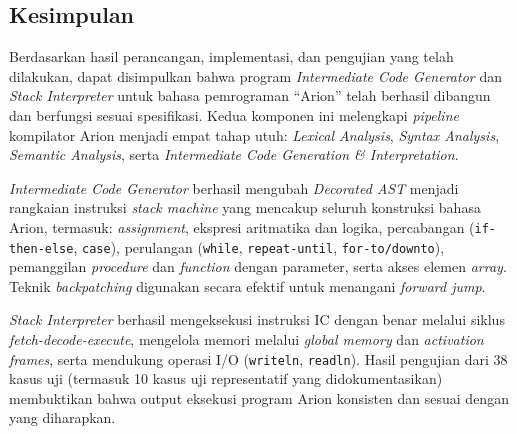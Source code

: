 \documentclass[12pt, a4paper]{article}
\begin{document}
\subsection{Kesimpulan}
Berdasarkan hasil perancangan, implementasi, dan pengujian yang telah dilakukan, dapat disimpulkan bahwa program \textit{Intermediate Code Generator} dan \textit{Stack Interpreter} untuk bahasa pemrograman ``Arion'' telah berhasil dibangun dan berfungsi sesuai spesifikasi. Kedua komponen ini melengkapi \textit{pipeline} kompilator Arion menjadi empat tahap utuh: \textit{Lexical Analysis}, \textit{Syntax Analysis}, \textit{Semantic Analysis}, serta \textit{Intermediate Code Generation \& Interpretation}.

\textit{Intermediate Code Generator} berhasil mengubah \textit{Decorated AST} menjadi rangkaian instruksi \textit{stack machine} yang mencakup seluruh konstruksi bahasa Arion, termasuk: \textit{assignment}, ekspresi aritmatika dan logika, percabangan (\texttt{if-then-else}, \texttt{case}), perulangan (\texttt{while}, \texttt{repeat-until}, \texttt{for-to/downto}), pemanggilan \textit{procedure} dan \textit{function} dengan parameter, serta akses elemen \textit{array}. Teknik \textit{backpatching} digunakan secara efektif untuk menangani \textit{forward jump}.

\textit{Stack Interpreter} berhasil mengeksekusi instruksi IC dengan benar melalui siklus \textit{fetch-decode-execute}, mengelola memori melalui \textit{global memory} dan \textit{activation frames}, serta mendukung operasi I/O (\texttt{writeln}, \texttt{readln}). Hasil pengujian dari 38 kasus uji (termasuk 10 kasus uji representatif yang didokumentasikan) membuktikan bahwa output eksekusi program Arion konsisten dan sesuai dengan yang diharapkan.
\end{document}
